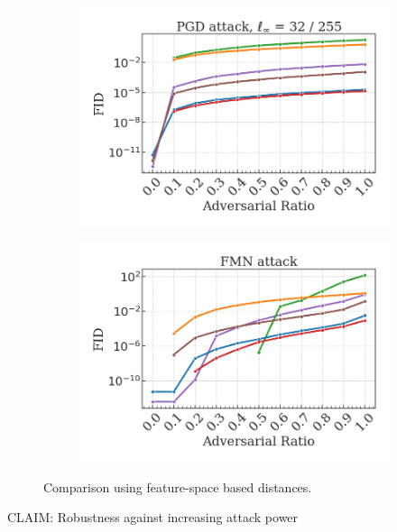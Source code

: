 \begin{figure}[H]
    \begin{subfigure}[b]{0.45\textwidth}
        \centering
        \includegraphics[width=\textwidth]{img/results_discussion/adversarial/PGD_FID.png}
    \end{subfigure}
    \hfill
    \begin{subfigure}[b]{0.45\textwidth}
        \centering
        \includegraphics[width=\textwidth]{img/results_discussion/adversarial/FMN_FID.png}
    \end{subfigure}

    \caption{Comparison using feature-space based distances.}
    \label{fig:six_figures}
\end{figure}



CLAIM: Robustness against increasing attack power

